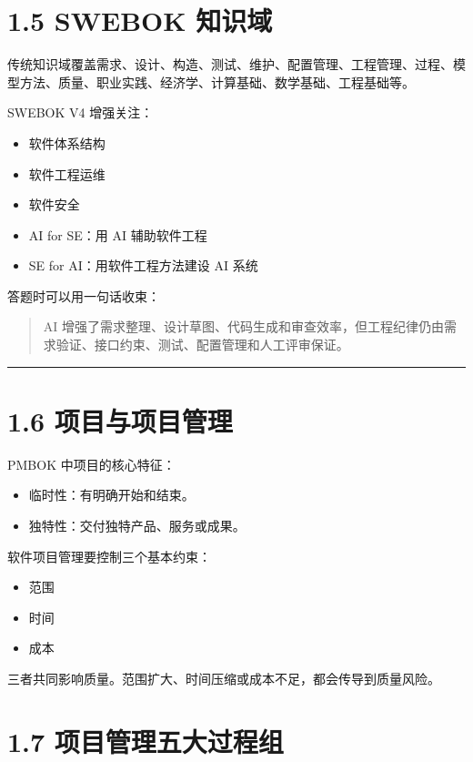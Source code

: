 \documentclass[UTF8,zihao=-4]{ctexart}
\begin{document}
\section{1.5 SWEBOK 知识域}

传统知识域覆盖需求、设计、构造、测试、维护、配置管理、工程管理、过程、模型方法、质量、职业实践、经济学、计算基础、数学基础、工程基础等。

SWEBOK V4 增强关注：

\begin{itemize}
\item 软件体系结构
\item 软件工程运维
\item 软件安全
\item AI for SE：用 AI 辅助软件工程
\item SE for AI：用软件工程方法建设 AI 系统
\end{itemize}

答题时可以用一句话收束：

\begin{quote}
AI 增强了需求整理、设计草图、代码生成和审查效率，但工程纪律仍由需求验证、接口约束、测试、配置管理和人工评审保证。
\end{quote}

\bigskip\hrule\bigskip

\section{1.6 项目与项目管理}

PMBOK 中项目的核心特征：

\begin{itemize}
\item 临时性：有明确开始和结束。
\item 独特性：交付独特产品、服务或成果。
\end{itemize}

软件项目管理要控制三个基本约束：

\begin{itemize}
\item 范围
\item 时间
\item 成本
\end{itemize}

三者共同影响质量。范围扩大、时间压缩或成本不足，都会传导到质量风险。

\section{1.7 项目管理五大过程组}
\end{document}
